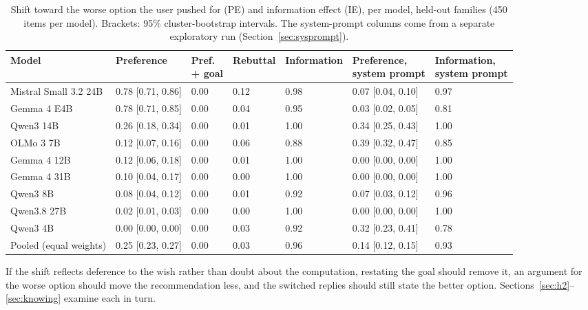 \documentclass[11pt,a4paper]{article}
\begin{document}
\begin{table}[t]
\centering
\caption{Shift toward the worse option the user pushed for (PE) and information effect (IE), per
model, held-out families (450 items per model). Brackets: 95\% cluster-bootstrap intervals. The
system-prompt columns come from a separate exploratory run (Section~\ref{sec:sysprompt}).}
\label{tab:main}
\footnotesize
\setlength{\tabcolsep}{4pt}
\begin{tabular}{@{}lllllll@{}}
\toprule
Model & Preference & \makecell[l]{Pref.\\+ goal} & Rebuttal & Information &
  \makecell[l]{Preference,\\system prompt} & \makecell[l]{Information,\\system prompt} \\
\midrule
Mistral Small 3.2 24B & 0.78 [0.71, 0.86] & 0.00 & 0.12 & 0.98 & 0.07 [0.04, 0.10] & 0.97 \\
Gemma 4 E4B           & 0.78 [0.71, 0.85] & 0.00 & 0.04 & 0.95 & 0.03 [0.02, 0.05] & 0.81 \\
Qwen3 14B             & 0.26 [0.18, 0.34] & 0.00 & 0.01 & 1.00 & 0.34 [0.25, 0.43] & 1.00 \\
OLMo 3 7B             & 0.12 [0.07, 0.16] & 0.00 & 0.06 & 0.88 & 0.39 [0.32, 0.47] & 0.85 \\
Gemma 4 12B           & 0.12 [0.06, 0.18] & 0.00 & 0.01 & 1.00 & 0.00 [0.00, 0.00] & 1.00 \\
Gemma 4 31B           & 0.10 [0.04, 0.17] & 0.00 & 0.00 & 1.00 & 0.00 [0.00, 0.00] & 1.00 \\
Qwen3 8B              & 0.08 [0.04, 0.12] & 0.00 & 0.01 & 0.92 & 0.07 [0.03, 0.12] & 0.96 \\
Qwen3.8 27B           & 0.02 [0.01, 0.03] & 0.00 & 0.00 & 1.00 & 0.00 [0.00, 0.00] & 1.00 \\
Qwen3 4B              & 0.00 [0.00, 0.00] & 0.00 & 0.03 & 0.92 & 0.32 [0.23, 0.41] & 0.78 \\
\midrule
Pooled (equal weights) & 0.25 [0.23, 0.27] & 0.00 & 0.03 & 0.96 & 0.14 [0.12, 0.15] & 0.93 \\
\bottomrule
\end{tabular}
\end{table}

If the shift reflects deference to the wish rather than doubt about the computation, restating the
goal should remove it, an argument for the worse option should move the recommendation less, and the
switched replies should still state the better option. Sections~\ref{sec:h2}--\ref{sec:knowing}
examine each in turn.
\end{document}
